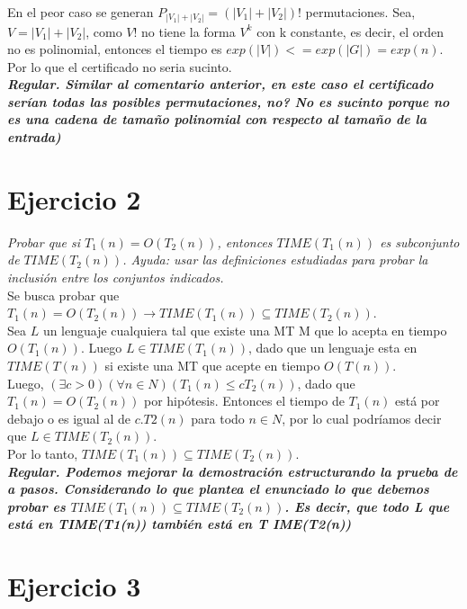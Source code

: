 \documentclass[lnbip]{svmultln}
\begin{document}
\begin{enumerate}
    En el peor caso se generan $P_{|V_{1}| + |V_{2}|} = (|V_{1}|+|V_{2}|)!$ permutaciones. Sea, $V = |V_{1}|+|V_{2}|$, como $V!$ no tiene la forma $V^k$ con k constante, es decir, el orden no es polinomial, entonces el tiempo es $exp(|V|) <= exp(|G|) = exp(n)$. Por lo que el certificado no seria sucinto. \\
    
    \textbf{\textit{Regular. Similar al comentario anterior, en este caso el certificado serían todas las posibles permutaciones, no? No es sucinto porque no es una cadena de tamaño polinomial con respecto al tamaño de la entrada)}}
\end{enumerate}

\section{Ejercicio 2} 

\textit{Probar que si $T_{1}(n) = O(T_{2}(n))$, entonces $TIME(T_{1}(n))$ es subconjunto de $TIME(T_{2}(n))$. Ayuda: usar las definiciones estudiadas para probar la inclusión entre los conjuntos indicados.} \\

Se busca probar que $T_{1}(n) = O(T_{2}(n)) \rightarrow TIME(T_{1}(n)) \subseteq TIME(T_{2}(n))$. \\

Sea $L$ un lenguaje cualquiera tal que existe una MT M que lo acepta en tiempo $O(T_{1}(n))$. Luego $L \in TIME(T_1(n))$, dado que un lenguaje esta en $TIME(T(n))$ si existe una MT que acepte en tiempo $O(T(n))$. \\

Luego, $(\exists c > 0) (\forall n \in N) (T_{1}(n) \leq cT_{2}(n))$, dado que $T_{1}(n) = O(T_{2}(n))$ por hipótesis. Entonces el tiempo de $T_{1}(n)$ está por debajo o es igual al de $c.T2(n)$ para todo $n \in N$, por lo cual podríamos decir que $L \in TIME(T_{2}(n))$. \\

Por lo tanto, $TIME(T_{1}(n)) \subseteq TIME(T_{2}(n))$. \\

\textbf{\textit{Regular. Podemos mejorar la demostración estructurando la prueba de a pasos. Considerando lo que plantea el enunciado lo que debemos probar es $TIME(T_{1}(n)) \subseteq TIME(T_{2}(n))$. Es decir, que todo L que está en TIME(T1(n)) también está en T IME(T2(n))}} \\

\section{Ejercicio 3} 
\end{document}
